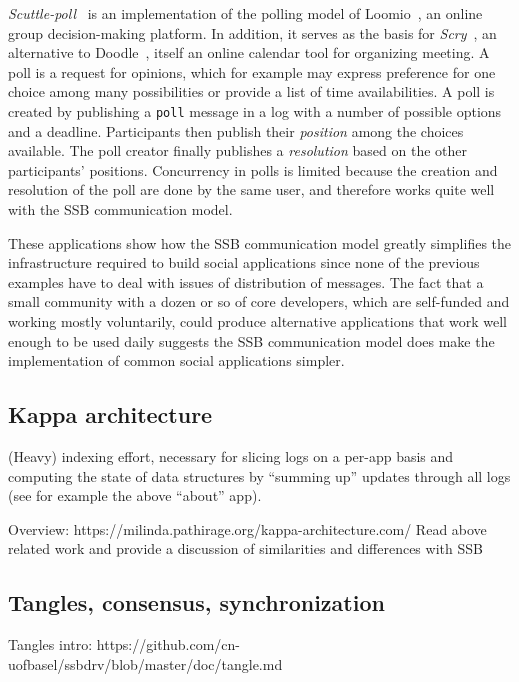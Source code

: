 \documentclass[sigconf]{acmart}
\begin{document}
\textit{Scuttle-poll}~\cite{scuttle-poll} is an implementation of the polling
model of Loomio~\cite{loomio}, an online group decision-making platform. In
addition, it serves as the basis for \textit{Scry}~\cite{patchbay-scry}, an
alternative to Doodle~\cite{doodle.com}, itself an online calendar tool for
organizing meeting. A poll is a request for opinions, which for example may
express preference for one choice among many possibilities or provide a list of
time availabilities. A poll is created by publishing a \texttt{poll} message in
a log with a number of possible options and a deadline. Participants then
publish their \textit{position} among the choices available. The poll creator
finally publishes a \textit{resolution} based on the other participants'
positions. Concurrency in polls is limited because the creation and resolution
of the poll are done by the same user, and therefore works quite well with the
SSB communication model.

These applications show how the SSB communication model greatly simplifies the
infrastructure required to build social applications since none of the previous
examples have to deal with issues of distribution of messages. The fact that a
small community with a dozen or so of core developers, which are self-funded
and working mostly voluntarily, could produce alternative applications that
work well enough to be used daily suggests the SSB communication model does
make the implementation of common social applications simpler.

\subsection{Kappa architecture}

(Heavy) indexing effort, necessary for slicing logs on a per-app basis
and computing the state of data structures by ``summing up'' updates
through all logs (see for example the above ``about'' app).

Overview: https://milinda.pathirage.org/kappa-architecture.com/
Read above related work and provide a discussion of similarities and differences with SSB

\subsection{Tangles, consensus, synchronization}
\label{Section:Tangle}

Tangles intro: https://github.com/cn-uofbasel/ssbdrv/blob/master/doc/tangle.md
\end{document}
